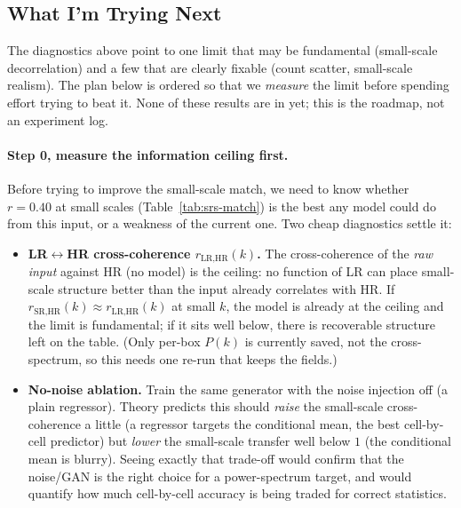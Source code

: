 \subsection{What I'm Trying Next}
\label{sec:srs-next}

The diagnostics above point to one limit that may be fundamental (small-scale
decorrelation) and a few that are clearly fixable (count scatter, small-scale
realism). The plan below is ordered so that we \emph{measure} the limit before
spending effort trying to beat it. None of these results are in yet; this is the
roadmap, not an experiment log.

\paragraph{Step 0, measure the information ceiling first.} Before trying to
improve the small-scale match, we need to know whether $r{=}0.40$ at small scales
(Table~\ref{tab:srs-match}) is the best any model could do from this input, or a
weakness of the current one. Two cheap diagnostics settle it:
\begin{itemize}
  \item \textbf{LR$\leftrightarrow$HR cross-coherence $r_\text{LR,HR}(k)$.} The
  cross-coherence of the \emph{raw input} against HR (no model) is the ceiling:
  no function of LR can place small-scale structure better than the input
  already correlates with HR. If $r_\text{SR,HR}(k)\approx r_\text{LR,HR}(k)$ at
  small $k$, the model is already at the ceiling and the limit is fundamental;
  if it sits well below, there is recoverable structure left on the table. (Only
  per-box $P(k)$ is currently saved, not the cross-spectrum, so this needs one
  re-run that keeps the fields.)
  \item \textbf{No-noise ablation.} Train the same generator with the noise
  injection off (a plain regressor). Theory predicts this should \emph{raise} the
  small-scale cross-coherence a little (a regressor targets the conditional mean,
  the best cell-by-cell predictor) but \emph{lower} the small-scale transfer well
  below $1$ (the conditional mean is blurry). Seeing exactly that trade-off would
  confirm that the noise/GAN is the right choice for a power-spectrum target, and
  would quantify how much cell-by-cell accuracy is being traded for correct
  statistics.
\end{itemize}

